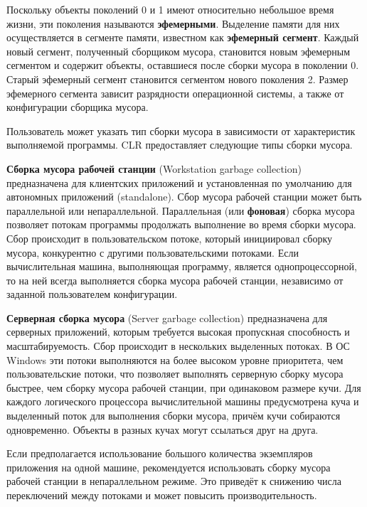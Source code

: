 Поскольку объекты поколений 0 и 1 имеют относительно небольшое время жизни, эти поколения называются \textbf{эфемерными}. Выделение памяти для них осуществляется в сегменте памяти, известном как \textbf{эфемерный сегмент}. Каждый новый сегмент, полученный сборщиком мусора, становится новым эфемерным сегментом и содержит объекты, оставшиеся после сборки мусора в поколении 0. Старый эфемерный сегмент становится сегментом нового поколения 2. Размер эфемерного сегмента зависит разрядности операционной системы, а также от конфигурации сборщика мусора. \cite{dotnet_gc}

Пользователь может указать тип сборки мусора в зависимости от характеристик выполняемой программы. CLR предоставляет следующие типы сборки мусора. \cite{dotnet_gc_types}

\textbf{Сборка мусора рабочей станции} (Workstation garbage collection) предназначена для клиентских приложений и установленная по умолчанию для автономных приложений (standalone). Сбор мусора рабочей станции может быть параллельной или непараллельной. Параллельная (или \textbf{фоновая}) сборка мусора позволяет потокам программы продолжать выполнение во время сборки мусора. Сбор происходит в пользовательском потоке, который инициировал сборку мусора, конкурентно с другими пользовательскими потоками. Если вычислительная машина, выполняющая программу, является однопроцессорной, то на ней всегда выполняется сборка мусора рабочей станции, независимо от заданной пользователем конфигурации.

\textbf{Серверная сборка мусора} (Server garbage collection) предназначена для серверных приложений, которым требуется высокая пропускная способность и масштабируемость. Сбор происходит в нескольких выделенных потоках. В ОС Windows эти потоки выполняются на более высоком уровне приоритета, чем пользовательские потоки, что позволяет выполнять серверную сборку мусора быстрее, чем сборку мусора рабочей станции, при одинаковом размере кучи. Для каждого логического процессора вычислительной машины предусмотрена куча и выделенный поток для выполнения сборки мусора, причём кучи собираются одновременно. Объекты в разных кучах могут ссылаться друг на друга.

Если предполагается использование большого количества экземпляров приложения на одной машине, рекомендуется использовать сборку мусора рабочей станции в непараллельном режиме. Это приведёт к снижению числа переключений между потоками и может повысить производительность. \cite{dotnet_gc_types}

